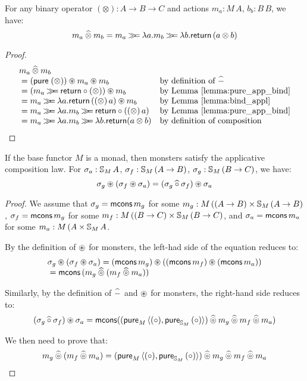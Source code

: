\begin{lemma}
For any binary operator $(\otimes):A\rightarrow B \rightarrow C$ and actions $m_a:M\,A$, $b_b:B\,B$, we have:
$$
m_a \mathbin{\widehat{\otimes}} m_b = m_a \mathbin{\gg\!\!=} \lambda a. m_b \mathbin{\gg\!\!=} \lambda b. \mathsf{return}\,(a \otimes b)
$$
\end{lemma}
\begin{proof}
$$
\begin{array}{ll}
m_a \alift{\otimes} m_b \\
{}= (\apure\;(\otimes)) \appl m_a \appl m_b
  & \mbox{by definition of }\alift{-}\\
{}= (m_a \bind \return \comp (\otimes)) \appl m_b
  & \mbox{by Lemma \ref{lemma:pure_app_bind}}\\
{}= m_a \bind \lambda a. \return\,((\otimes)\,a) \appl m_b
  & \mbox{by Lemma \ref{lemma:bind_appl}}\\
{}= m_a \bind \lambda a. m_b \bind \return \comp ((\otimes)\,a)
  & \mbox{by Lemma \ref{lemma:pure_app_bind}}\\
{}= m_a \bind \lambda a. m_b \bind \lambda b. \return (a \otimes b)
  & \mbox{by definition of composition}
\end{array}
$$
\end{proof}

\begin{lemma}
If the base functor $M$ is a monad, then monsters satisfy the applicative composition law.
For $\sigma_a:\mathbb{S}_{M}\,A$, $\sigma_f : \mathbb{S}_{M}\,(A\rightarrow B)$, $\sigma_g: \mathbb{S}_{M}\,(B\rightarrow C)$, we have:
$$
\sigma_g \circledast (\sigma_f \circledast \sigma_a) = (\sigma_g \mathbin{\widehat{\circ}} \sigma_f) \circledast \sigma_a
$$
\end{lemma}
\begin{proof}
We assume that $\sigma_g = \mathsf{mcons}\,m_g$ for some $m_g:M\,((A\rightarrow B)\times \mathbb{S}_{M}\,(A\rightarrow B)$, $\sigma_f = \mathsf{mcons}\,m_g$ for some $m_f:M\,((B\rightarrow C)\times \mathbb{S}_{M}\,(B\rightarrow C)$, and $\sigma_a = \mathsf{mcons}\,m_a$ for some $m_a:M\,(A\times \mathbb{S}_{M}\,A$.

By the definition of $\circledast$ for monsters, the left-had side of the equation reduces to:
$$
\begin{array}{l}
\sigma_g \circledast (\sigma_f \circledast \sigma_a) 
 = (\mathsf{mcons}\,m_g) \circledast ((\mathsf{mcons}\,m_f) \circledast (\mathsf{mcons}\,m_a))\\
{}= \mathsf{mcons}\,(m_g \mathbin{\widehat{\circledcirc}} (m_f \mathbin{\widehat{\circledcirc}} m_a))
\end{array}
$$

Similarly, by the definition of $\mathbin{\widehat{-}}$ and $\circledast$ for monsters, the right-hand side reduces to:
$$
(\sigma_g \mathbin{\widehat{\circ}} \sigma_f) \circledast \sigma_a
  = \mathsf{mcons}((\mathsf{pure}_M\,\langle (\circ), \mathsf{pure}_{\mathbb{S}_{M}}\,(\circ)\rangle)
    \mathbin{\widehat{\circledcirc}} m_g \mathbin{\widehat{\circledcirc}} m_f \mathbin{\widehat{\circledcirc}} m_a)
$$

We then need to prove that:
$$
m_g \mathbin{\widehat{\circledcirc}} (m_f \mathbin{\widehat{\circledcirc}} m_a)
  = (\mathsf{pure}_M\,\langle (\circ), \mathsf{pure}_{\mathbb{S}_{M}}\,(\circ)\rangle)
    \mathbin{\widehat{\circledcirc}} m_g \mathbin{\widehat{\circledcirc}} m_f \mathbin{\widehat{\circledcirc}} m_a
$$
\end{proof}
